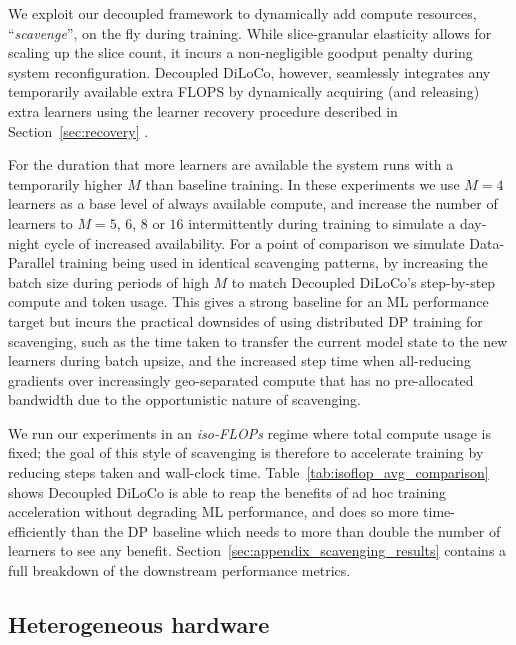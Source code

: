 \documentclass[11pt, a4paper, twocolumn, copyright, google]{google}
\begin{document}
We exploit our decoupled framework to dynamically add compute resources, ``\emph{scavenge}'', on the fly during training. While slice-granular elasticity \citep{geminiteam2025gemini2p5} allows for scaling up the slice count, it incurs a non-negligible goodput penalty during system reconfiguration. Decoupled DiLoCo, however, seamlessly integrates any temporarily available extra FLOPS by dynamically acquiring (and releasing) extra learners using the learner recovery procedure described in Section~\ref{sec:recovery} .

For the duration that more learners are available the system runs with a temporarily higher $M$ than baseline training. In these experiments we use $M = 4$ learners as a base level of always available compute, and increase the number of learners to $M=5$, $6$, $8$ or $16$ intermittently during training to simulate a day-night cycle of increased availability. For a point of comparison we simulate Data-Parallel training being used in identical scavenging patterns, by increasing the batch size during periods of high $M$ to match Decoupled DiLoCo's step-by-step compute and token usage. This gives a strong baseline for an ML performance target but incurs the practical downsides of using distributed DP training for scavenging, such as the time taken to transfer the current model state to the new learners during batch upsize, and the increased step time when all-reducing gradients over increasingly geo-separated compute that has no pre-allocated bandwidth due to the opportunistic nature of scavenging.

We run our experiments in an \emph{iso-FLOPs} regime where total compute usage is fixed; the goal of this style of scavenging is therefore to accelerate training by reducing steps taken and wall-clock time. Table~\ref{tab:isoflop_avg_comparison} shows Decoupled DiLoCo is able to reap the benefits of ad hoc training acceleration without degrading ML performance, and does so more time-efficiently than the DP baseline which needs to more than double the number of learners to see any benefit. Section~\ref{sec:appendix_scavenging_results} contains a full breakdown of the downstream performance metrics.

\subsection{Heterogeneous hardware}\label{sec:exp_hetero_hw}
\end{document}
